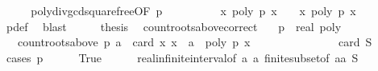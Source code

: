 \begin{isabellebody}
\ \ \isamarkupfalse%
\ \isamarkupfalse%
\ poly{\isacharunderscore}div{\isacharunderscore}gcd{\isacharunderscore}squarefree{\isacharparenleft}{}{\isacharparenright}{\isacharbrackleft}OF\ {\isacharbackquoteopen}p\ {\isasymnoteq}\ {}{\isacharbackquoteclose}{\isacharbrackright}\isanewline
\ \ \ \ \ \ \isamarkupfalse%
\ {\isachardoublequoteopen}{\isacharbraceleft}x{\isachardot}\ poly\ p{\isacharprime}\ x\ {\isacharequal}\ {}{\isacharbraceright}\ {\isacharequal}\ {\isacharbraceleft}x{\isachardot}\ poly\ p\ x\ {\isacharequal}\ {}{\isacharbraceright}{\isachardoublequoteclose}\ \isamarkupfalse%
\ p{\isacharprime}{\isacharunderscore}def\ \isamarkupfalse%
\ blast\isanewline
\ \ \isamarkupfalse%
\ \isamarkupfalse%
\ {\isacharquery}thesis\ \isacommand{{\isachardot}}\isamarkupfalse%
\isanewline
{}\isamarkupfalse%
%
\endisatagproof
{\isafoldproof}%
%
\isadelimproof
\isanewline
%
\endisadelimproof
\isanewline
{}\isamarkupfalse%
\ count{\isacharunderscore}roots{\isacharunderscore}above{\isacharunderscore}correct{\isacharcolon}\isanewline
\ \ \ p\ {\isacharcolon}{\isacharcolon}\ {\isachardoublequoteopen}real\ poly{\isachardoublequoteclose}\isanewline
\ \ \ {\isachardoublequoteopen}count{\isacharunderscore}roots{\isacharunderscore}above\ p\ a\ {\isacharequal}\ card\ {\isacharbraceleft}x{\isachardot}\ x\ {\isachargreater}\ a\ {\isasymand}\ poly\ p\ x\ {\isacharequal}\ {}{\isacharbraceright}{\isachardoublequoteclose}\ \isanewline
\ \ \ \ \ \ \ \ \ {\isacharparenleft}\ {\isachardoublequoteopen}{\isacharunderscore}\ {\isacharequal}\ card\ {\isacharquery}S{\isachardoublequoteclose}{\isacharparenright}\isanewline
%
\isadelimproof
%
\endisadelimproof
%
\isatagproof
{}\isamarkupfalse%
\ {\isacharparenleft}cases\ {\isachardoublequoteopen}p\ {\isacharequal}\ {}{\isachardoublequoteclose}{\isacharparenright}\isanewline
\ \ \isamarkupfalse%
\ True\isanewline
\ \ \ \ \isamarkupfalse%
\ real{\isacharunderscore}infinite{\isacharunderscore}interval{\isacharbrackleft}of\ a\ {\isachardoublequoteopen}a{\isacharplus}{}{\isachardoublequoteclose}{\isacharbrackright}\ finite{\isacharunderscore}subset{\isacharbrackleft}of\ {\isachardoublequoteopen}{\isacharbraceleft}a{\isacharless}{\isachardot}{\isachardot}{\isacharless}a{\isacharplus}{}{\isacharbraceright}{\isachardoublequoteclose}\ {\isacharquery}S{\isacharbrackright}\isanewline

\end{isabellebody}
